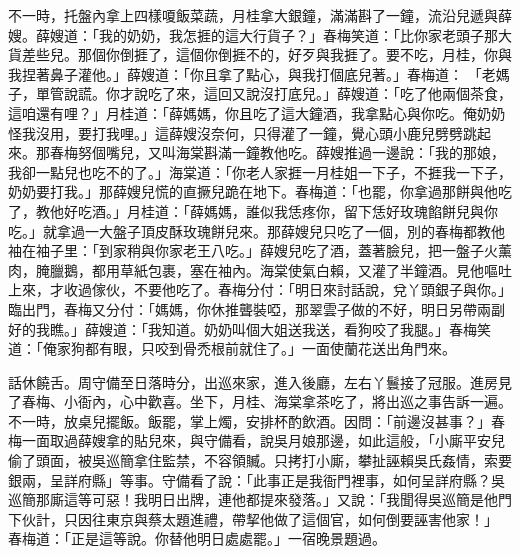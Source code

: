 \begin{showcontents}{}
不一時，托盤內拿上四樣嗄飯菜蔬，月桂拿大銀鐘，滿滿斟了一鐘，流沿兒遞與薛嫂。薛嫂道：「我的奶奶，我怎捱的這大行貨子？」春梅笑道：「比你家老頭子那大貨差些兒。那個你倒捱了，這個你倒捱不的，好歹與我捱了。要不吃，月桂，你與我捏著鼻子灌他。」薛嫂道：「你且拿了點心，與我打個底兒著。」春梅道： 「老媽子，單管說謊。你才說吃了來，這回又說沒打底兒。」薛嫂道：「吃了他兩個茶食，這咱還有哩？」月桂道：「薛媽媽，你且吃了這大鐘酒，我拿點心與你吃。俺奶奶怪我沒用，要打我哩。」這薛嫂沒奈何，只得灌了一鐘，覺心頭小鹿兒劈劈跳起來。那春梅努個嘴兒，又叫海棠斟滿一鐘教他吃。薛嫂推過一邊說：「我的那娘，我卻一點兒也吃不的了。」海棠道：「你老人家捱一月桂姐一下子，不捱我一下子，奶奶要打我。」那薛嫂兒慌的直撅兒跪在地下。春梅道：「也罷，你拿過那餅與他吃了，教他好吃酒。」月桂道：「薛媽媽，誰似我恁疼你，留下恁好玫瑰餡餅兒與你吃。」就拿過一大盤子頂皮酥玫瑰餅兒來。那薛嫂兒只吃了一個，別的春梅都教他袖在袖子里：「到家稍與你家老王八吃。」薛嫂兒吃了酒，蓋著臉兒，把一盤子火薰肉，腌臘鵝，都用草紙包裹，塞在袖內。海棠使氣白賴，又灌了半鐘酒。見他嘔吐上來，才收過傢伙，不要他吃了。春梅分付：「明日來討話說，兌丫頭銀子與你。」臨出門，春梅又分付：「媽媽，你休推聾裝啞，那翠雲子做的不好，明日另帶兩副好的我瞧。」薛嫂道：「我知道。奶奶叫個大姐送我送，看狗咬了我腿。」春梅笑道：「俺家狗都有眼，只咬到骨禿根前就住了。」一面使蘭花送出角門來。

話休饒舌。周守備至日落時分，出巡來家，進入後廳，左右丫鬟接了冠服。進房見了春梅、小衙內，心中歡喜。坐下，月桂、海棠拿茶吃了，將出巡之事告訴一遍。不一時，放桌兒擺飯。飯罷，掌上燭，安排杯酌飲酒。因問：「前邊沒甚事？」春梅一面取過薛嫂拿的貼兒來，與守備看，說吳月娘那邊，如此這般，「小廝平安兒偷了頭面，被吳巡簡拿住監禁，不容領贓。只拷打小廝，攀扯誣賴吳氏姦情，索要銀兩，呈詳府縣」等事。守備看了說：「此事正是我衙門裡事，如何呈詳府縣？吳巡簡那廝這等可惡！我明日出牌，連他都提來發落。」又說：「我聞得吳巡簡是他門下伙計，只因往東京與蔡太題進禮，帶挈他做了這個官，如何倒要誣害他家！」 春梅道：「正是這等說。你替他明日處處罷。」一宿晚景題過。


\end{showcontents}
